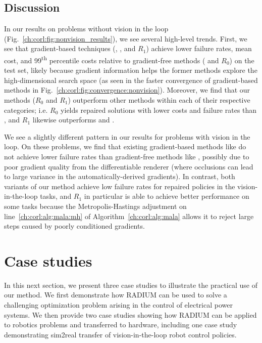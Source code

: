 \subsection{Discussion}

In our results on problems without vision in the loop (Fig.~\ref{ch:corl:fig:nonvision_results}), we see several high-level trends. First, we see that gradient-based techniques (\gdr, \gda, and $R_1$) achieve lower failure rates, mean cost, and 99\textsuperscript{th} percentile costs relative to gradient-free methods (\ltc{} and $R_0$) on the test set, likely because gradient information helps the former methods explore the high-dimensional search space (as seen in the faster convergence of gradient-based methods in Fig.~\ref{ch:corl:fig:convergence:nonvision}). Moreover, we find that our methods ($R_0$ and $R_1$) outperform other methods within each of their respective categories; i.e. $R_0$ yields repaired solutions with lower costs and failure rates than \ltc, and $R_1$ likewise outperforms \gdr{} and \gda{}.

We see a slightly different pattern in our results for problems with vision in the loop. On these problems, we find that existing gradient-based methods like \gda{} do not achieve lower failure rates than gradient-free methods like \ltc{}, possibly due to poor gradient quality from the differentiable renderer (where occlusions can lead to large variance in the automatically-derived gradients). In contrast, both variants of our method achieve low failure rates for repaired policies in the vision-in-the-loop tasks, and $R_1$ in particular is able to achieve better performance on some tasks because the Metropolis-Hastings adjustment on line~\ref{ch:corl:alg:mala:mh} of Algorithm~\ref{ch:corl:alg:mala} allows it to reject large steps caused by poorly conditioned gradients.

\section{Case studies}\label{ch:corl:case_studies}

In this next section, we present three case studies to illustrate the practical use of our method. We first demonstrate how RADIUM can be used to solve a challenging optimization problem arising in the control of electrical power systems. We then provide two case studies showing how RADIUM can be applied to robotics problems and transferred to hardware, including one case study demonstrating sim2real transfer of vision-in-the-loop robot control policies.

